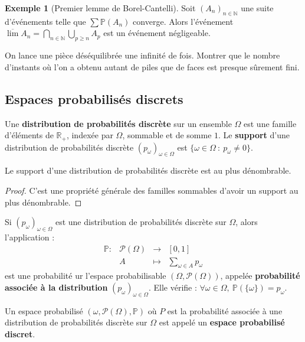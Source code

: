 \documentclass[french]{article}
\renewcommand{\P}{\mathbb{P}}
\newcommand{\N}{\mathbb{N}}
\newcommand{\R}{\mathbb{R}}
\theoremstyle{plain}
\theoremstyle{definition}
\newtheorem*{ex}{Exemple}
\theoremstyle{remark}
\begin{document}
\begin{ex}[Premier lemme de Borel-Cantelli]
	Soit $(A_n)_{n\in\N}$ une suite d'événements telle que $\displaystyle\sum\P(A_n)$ converge. Alors l'événement $\overline{\lim}A_n=\displaystyle\bigcap_{n\in\N}\bigcup_{p\geqslant n}A_p$ est un événement négligeable.
\end{ex}

\begin{exo}
	On lance une pièce déséquilibrée une infinité de fois. Montrer que le nombre d'instants où l'on a obtenu autant de piles que de faces est presque sûrement fini.
\end{exo}

\subsection{Espaces probabilisés discrets}

\begin{dfn}
	Une \textbf{distribution de probabilités discrète} sur un ensemble $\Omega$ est une famille d'éléments de $\R_+$, indexée par $\Omega$, sommable et de somme $1$. Le \textbf{support} d'une distribution de probabilités discrète $(p_\omega)_{\omega\in\Omega}$ est $\{\omega\in\Omega\ :\ p_{\omega}\ne0\}$.
\end{dfn}

\begin{prop}%
	Le support d'une distribution de probabilités discrète est au plus dénombrable.
\end{prop}
\begin{proof}
	C'est une propriété générale des familles sommables d'avoir un support au plus dénombrable.
\end{proof}

\begin{prop}%
	Si $(p_\omega)_{\omega\in\Omega}$ est une distribution de probabilités discrète sur $\Omega$, alors l'application :
	$$\begin{array}{lrcl}
		\P:&\mathcal{P}(\Omega)&\longrightarrow&[0,1]\\
		&A&\longmapsto&\displaystyle\sum_{\omega\in A}p_\omega
	\end{array}$$ est une probabilité ur l'espace probabilisable $(\Omega,\mathcal{P}(\Omega))$, appelée \textbf{probabilité associée à la distribution} $(p_\omega)_{\omega\in\Omega}$. Elle vérifie : $\forall\omega\in\Omega,\ \P(\{\omega\})=p_\omega$.
\end{prop}

\begin{dfn}
	Un espace probabilisé $(\omega,\mathcal{P}(\Omega),\P)$ où $P$ est la probabilité associée à une distribution de probabilités discrète sur $\Omega$ est appelé un \textbf{espace probabilisé discret}.
\end{dfn}
\end{document}
